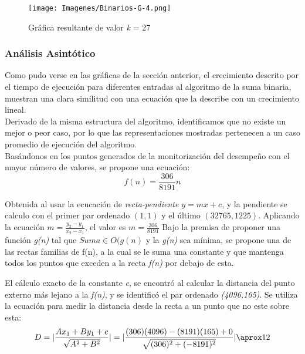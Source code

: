 \documentclass{report}
\begin{document}
\begin{center}
            \begin{figure}[h]
            	\centering
            	\texttt{[image: Imagenes/Binarios-G-4.png]}
                \caption{Gráfica resultante de valor \textit{k} = 27}
            \end{figure}
            
            \end{center}
            
        \subsubsection*{Análisis Asintótico}
        
        Como pudo verse en las gráficas de la sección anterior, el crecimiento descrito por el tiempo de ejecución para diferentes entradas al algoritmo de la suma binaria, muestran una clara similitud con una ecuación que la describe con un crecimiento lineal.\\
        
        Derivado de la misma estructura del algoritmo, identificamos que no existe un mejor o peor caso, por lo que las representaciones mostradas pertenecen a un caso promedio de ejecución del algoritmo. \\
        
        Basándonos en los puntos generados de la monitorización del desempeño con el mayor número de valores, se propone una ecuación:
        $$f(n)=\frac{306}{8191}n $$
        
        Obtenida al usar la ecucación de \textit{recta-pendiente} $y=mx+c$, y la pendiente se calculo con el primer par ordenado $(1,1)$ y el último $(32765,1225)$. Aplicando la ecuación $m=\frac{y_2-y_1}{x_2-x_1}$, el valor es $m=\frac{306}{8191}$
         Bajo la premisa de proponer una función \textit{g(n)} tal que $Suma \in O(g(n)$ y la \textit{g(n)} sea mínima, se propone una de las rectas familias de f(n), a la cual se le suma una constante y que mantenga todos los puntos que exceden a la recta \textit{f(n)} por debajo de esta.
        
        El cálculo exacto de la constante \textit{c}, se encontró al calcular la distancia del punto externo más lejano a la \textit{f(n)}, y se identificó el par ordenado \textit{(4096,165)}. Se utiliza la ecuación para medir la distancia desde la recta a un punto que no este sobre esta:
        $$
            D=|\frac{Ax_1+By_1+c}{\sqrt{A^2+B^2}}|=|\frac{(306)(4096)-(8191)(165)+0}{\sqrt{(306)^2+(-8191)^2}}|\aprox 12
        $$
        
\end{document}

